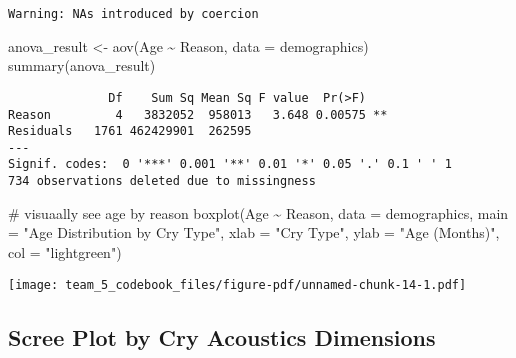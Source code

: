 \documentclass[
  letterpaper,
  DIV=11,
  numbers=noendperiod]{scrartcl}
\newenvironment{Shaded}{\begin{snugshade}}{\end{snugshade}}
\newcommand{\AttributeTok}[1]{\textcolor[rgb]{0.40,0.45,0.13}{#1}}
\newcommand{\CommentTok}[1]{\textcolor[rgb]{0.37,0.37,0.37}{#1}}
\newcommand{\FunctionTok}[1]{\textcolor[rgb]{0.28,0.35,0.67}{#1}}
\newcommand{\NormalTok}[1]{\textcolor[rgb]{0.00,0.23,0.31}{#1}}
\newcommand{\OtherTok}[1]{\textcolor[rgb]{0.00,0.23,0.31}{#1}}
\newcommand{\SpecialCharTok}[1]{\textcolor[rgb]{0.37,0.37,0.37}{#1}}
\newcommand{\StringTok}[1]{\textcolor[rgb]{0.13,0.47,0.30}{#1}}
\begin{document}
\begin{verbatim}
Warning: NAs introduced by coercion
\end{verbatim}

\begin{Shaded}
\begin{Highlighting}[]
\NormalTok{anova\_result }\OtherTok{\textless{}{-}} \FunctionTok{aov}\NormalTok{(Age }\SpecialCharTok{\textasciitilde{}}\NormalTok{ Reason, }\AttributeTok{data =}\NormalTok{ demographics)}
\FunctionTok{summary}\NormalTok{(anova\_result)}
\end{Highlighting}
\end{Shaded}

\begin{verbatim}
              Df    Sum Sq Mean Sq F value  Pr(>F)   
Reason         4   3832052  958013   3.648 0.00575 **
Residuals   1761 462429901  262595                   
---
Signif. codes:  0 '***' 0.001 '**' 0.01 '*' 0.05 '.' 0.1 ' ' 1
734 observations deleted due to missingness
\end{verbatim}

\begin{Shaded}
\begin{Highlighting}[]
\CommentTok{\# visuaally see age by reason}
\FunctionTok{boxplot}\NormalTok{(Age }\SpecialCharTok{\textasciitilde{}}\NormalTok{ Reason, }\AttributeTok{data =}\NormalTok{ demographics,}
        \AttributeTok{main =} \StringTok{"Age Distribution by Cry Type"}\NormalTok{,}
        \AttributeTok{xlab =} \StringTok{"Cry Type"}\NormalTok{,}
        \AttributeTok{ylab =} \StringTok{"Age (Months)"}\NormalTok{,}
        \AttributeTok{col =} \StringTok{"lightgreen"}\NormalTok{)}
\end{Highlighting}
\end{Shaded}

\begin{center}
\texttt{[image: team\_5\_codebook\_files/figure-pdf/unnamed-chunk-14-1.pdf]}
\end{center}

\subsection{Scree Plot by Cry Acoustics
Dimensions}\label{scree-plot-by-cry-acoustics-dimensions}
\end{document}
